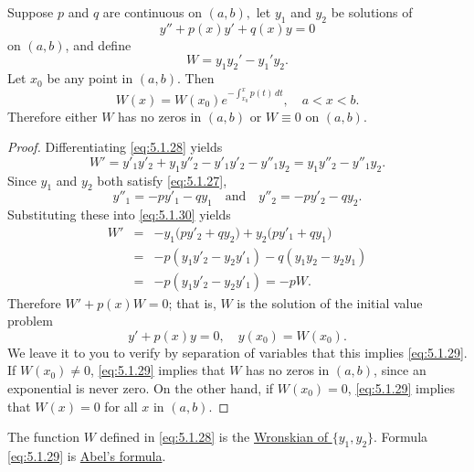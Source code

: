 \documentclass{ximera}
\begin{document}
\begin{theorem}\label{thmtype:5.1.4}
Suppose $p$ and $q$ are continuous on $(a,b),$ let $y_1$ and
$y_2$ be solutions of
\begin{equation}\label{eq:5.1.27}
y''+p(x)y'+q(x)y=0
\end{equation}
on $(a,b)$, and define
\begin{equation}\label{eq:5.1.28}
W=y_1y_2'-y_1'y_2.
\end{equation}
Let  $x_0$ be any point in $(a,b).$ Then
\begin{equation} \label{eq:5.1.29}
W(x)=W(x_0) e^{-\int^x_{x_0}p(t)\,
dt}, \quad a<x<b.
\end{equation}
Therefore  either $W$ has no zeros in  $(a,b)$ or $W\equiv0$
on  $(a,b).$
\end{theorem}
 
 
 
\begin{proof}
Differentiating \eqref{eq:5.1.28} yields
\begin{equation}\label{eq:5.1.30}
W'=y'_1y'_2+y_1y''_2-y'_1y'_2-y''_1y_2=
y_1y''_2-y''_1y_2.
\end{equation}
 Since $y_1$ and $y_2$ both satisfy \eqref{eq:5.1.27},
$$
y''_1 =-py'_1-qy_1\quad\mbox{and}\quad
y''_2 =-py'_2-qy_2.
$$
Substituting these into \eqref{eq:5.1.30} yields
\begin{eqnarray*}
W'&=& -y_1\bigl(py'_2+qy_2\bigr)
+y_2\bigl(py'_1+qy_1\bigr) \\
&=&  -p(y_1y'_2-y_2y'_1)-q(y_1y_2-y_2y_1)\\
&=& -p(y_1y'_2-y_2y'_1)=-pW.
\end{eqnarray*}
Therefore $W'+p(x)W=0$;
that is, $W$ is the solution of the initial value problem
$$
y'+p(x)y=0,\quad y(x_0)=W(x_0).
$$
We leave it to you to verify by separation of variables that this
implies \eqref{eq:5.1.29}. If $W(x_0)\ne0$, \eqref{eq:5.1.29} implies
that
$W$ has no zeros in $(a,b)$, since an exponential is never zero. On
the other hand, if $W(x_0)=0$,  \eqref{eq:5.1.29} implies that $W(x)=0$
for all $x$ in $(a,b)$.
\end{proof}
 
The function $W$ defined in \eqref{eq:5.1.28} is  the
\href{http://www-history.mcs.st-and.ac.uk/Mathematicians/Wronski.html}
{Wronskian of $\{y_1,y_2\}$}.
 Formula \eqref{eq:5.1.29} is
 \href{http://www-history.mcs.st-and.ac.uk/Mathematicians/Abel.html}
{Abel's formula}.
 
\end{document}
